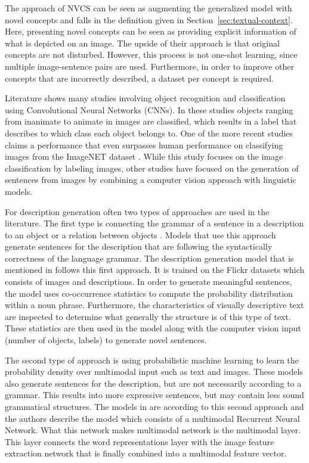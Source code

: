 The approach of NVCS can be seen as augmenting the generalized model with novel concepts and falls in the definition given in Section~\ref{sec:textual-context}. Here, presenting novel concepts can be seen as  providing explicit information of what is depicted on an image. The upside of their approach is that original concepts are not disturbed. However, this process is not one-shot learning, since multiple image-sentence pairs are used. Furthermore, in order to improve other concepts that are incorrectly described, a dataset per concept is required.

Literature shows many studies involving object recognition and classification \cite{carbonetto2004statistical, he2015delving} using Convolutional Neural Networks (CNNs). In these studies objects ranging from inanimate to animate in images are classified, which results in a label that describes to which class each object belongs to. One of the more recent studies \cite{he2015delving} claims a performance that even surpasses human performance on classifying images from the ImageNET dataset \cite{russakovsky2014imagenet}. While this study focuses on the image classification by labeling images, other studies \cite{mao2014explain, mitchell2012midge, Yang2011, Farhadi2010} have focused on the generation of sentences from images by combining a computer vision approach with linguistic models. 

For description generation often two types of approaches are used in the literature. The first type is connecting the grammar of a sentence in a description to an object or a relation between objects \cite{karpathyjoulin2014deep, Farhadi2010}. Models that use this approach generate sentences for the description that are following the syntactically correctness of the language grammar. The description generation model that is mentioned in \cite{mitchell2012midge} follows this first approach. It is trained on the Flickr datasets which consists of images and descriptions. In order to generate meaningful sentences, the model uses co-occurrence statistics to compute the probability distribution within a noun phrase. Furthermore, the characteristics of visually descriptive text are inspected to determine what generally the structure is of this type of text. These statistics are then used in the model along with the computer vision input (number of objects, labels) to generate novel sentences.

The second type of approach is using probabilistic machine learning to learn the probability density over multimodal input such as text and images. These models also generate sentences for the description, but are not necessarily according to a grammar. This results into more expressive sentences, but may contain less sound grammatical structures. The models in \cite{mao2014explain,karpathyfeifei2014deep,karpathyjoulin2014deep} are according to this second approach and the authors describe the model which consists of a multimodal Recurrent Neural Network. What this network makes multimodal network is the multimodal layer. This layer connects the word representations layer with the image feature extraction network that is finally combined into a multimodal feature vector. 

